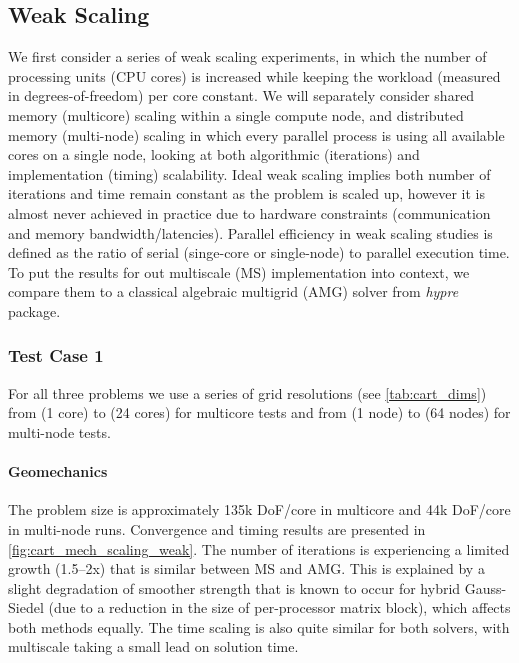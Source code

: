 \subsection{Weak Scaling}

We first consider a series of weak scaling experiments, in which the number of processing units (CPU cores) is increased while keeping the workload (measured in degrees-of-freedom) per core constant.   We will separately consider shared memory (multicore) scaling within a single compute node, and distributed memory (multi-node) scaling in which every parallel process is using all available cores on a single node, looking at both algorithmic (iterations) and implementation (timing) scalability.   Ideal weak scaling implies both number of iterations and time remain constant as the problem is scaled up, however it is almost never achieved in practice due to hardware constraints (communication and memory bandwidth/latencies).   Parallel efficiency in weak scaling studies is defined as the ratio of serial (singe-core or single-node) to parallel execution time.   To put the results for out multiscale (MS) implementation into context, we compare them to a classical algebraic multigrid (AMG) solver from \textit{hypre} package. 

\subsubsection{Test Case 1}

For all three problems we use a series of grid resolutions (see \cref{tab:cart_dims}) from  (1 core) to  (24 cores) for multicore tests and from  (1 node) to  (64 nodes) for multi-node tests.   

\paragraph{Geomechanics}
The problem size is approximately 135k DoF/core in multicore and 44k DoF/core in multi-node runs.   Convergence and timing results are presented in \cref{fig:cart_mech_scaling_weak}.   The number of iterations is experiencing a limited growth (1.5--2x) that is similar between MS and AMG.   This is explained by a slight degradation of smoother strength that is known to occur for hybrid Gauss-Siedel (due to a reduction in the size of per-processor matrix block), which affects both methods equally.   The time scaling is also quite similar for both solvers, with multiscale taking a small lead on solution time.

